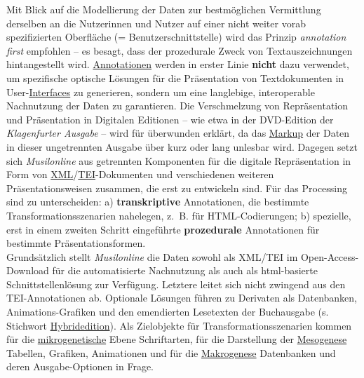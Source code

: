 \documentclass{article}
\begin{document}
    Mit Blick auf die Modellierung der Daten zur bestmöglichen Vermittlung derselben
                  an die Nutzerinnen und Nutzer auf einer nicht weiter vorab spezifizierten
                  Oberfläche (= Benutzerschnittstelle) wird das Prinzip \emph{annotation
                     first} empfohlen – es besagt, dass der prozedurale Zweck von
                  Textauszeichnungen hintangestellt wird. \href{http://gams.uni-graz.at/o:konde.17}{Annotationen} werden in erster Linie \textbf{nicht}  dazu
                  verwendet, um spezifische optische Lösungen für die Präsentation von
                  Textdokumenten in User-\href{http://gams.uni-graz.at/o:konde.98}{Interfaces}
                  zu generieren, sondern um eine langlebige, interoperable Nachnutzung der Daten zu
                  garantieren. Die Verschmelzung von Repräsentation und Präsentation in Digitalen
                  Editionen – wie etwa in der DVD-Edition der \emph{Klagenfurter
                     Ausgabe} – wird für überwunden erklärt, da das \href{http://gams.uni-graz.at/o:konde.126}{Markup} der Daten in dieser ungetrennten Ausgabe
                  über kurz oder lang unlesbar wird. Dagegen setzt sich \emph{Musilonline} aus getrennten Komponenten für die digitale Repräsentation in
                  Form von \href{http://gams.uni-graz.at/o:konde.215}{XML}/\href{http://gams.uni-graz.at/o:konde.178}{TEI}-Dokumenten und verschiedenen weiteren
                  Präsentationsweisen zusammen, die erst zu entwickeln sind. Für das Processing sind
                  zu unterscheiden: a) \textbf{transkriptive}  Annotationen, die
                  bestimmte Transformationsszenarien nahelegen, z. B. für HTML-Codierungen; b)
                  spezielle, erst in einem zweiten Schritt eingeführte \textbf{prozedurale
                  }  Annotationen für bestimmte Präsentationsformen.\\
            
        Grundsätzlich stellt \emph{Musilonline} die Daten sowohl als
                  XML/TEI im Open-Access-Download für die automatisierte Nachnutzung als auch als
                  html-basierte Schnittstellenlösung zur Verfügung. Letztere leitet sich nicht
                  zwingend aus den TEI-Annotationen ab. Optionale Lösungen führen zu Derivaten als
                  Datenbanken, Animations-Grafiken und den emendierten Lesetexten der Buchausgabe
                  (s. Stichwort \href{http://gams.uni-graz.at/o:konde.96}{Hybridedition}). Als
                  Zielobjekte für Transformationsszenarien kommen für die \href{http://gams.uni-graz.at/o:konde.26}{mikrogenetische} Ebene Schriftarten, für die
                  Darstellung der \href{http://gams.uni-graz.at/o:konde.24}{Mesogenese}
                  Tabellen, Grafiken, Animationen und für die \href{http://gams.uni-graz.at/o:konde.23}{Makrogenese} Datenbanken und deren Ausgabe-Optionen
                  in Frage. \\
            
\end{document}
